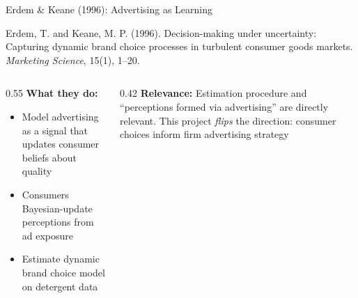 \documentclass[aspectratio=169,professionalfonts]{beamer}
\newcommand{\hl}[1]{\textbf{\textcolor{UGARed}{#1}}}
\begin{document}
\begin{frame}{Erdem \& Keane (1996): Advertising as Learning}
  \begin{tcolorbox}[colback=red!5!white, colframe=UGARed, title=\textbf{Citation}]
    Erdem, T. and Keane, M. P. (1996). Decision-making under uncertainty: Capturing
    dynamic brand choice processes in turbulent consumer goods markets.
    \textit{Marketing Science}, 15(1), 1--20.
  \end{tcolorbox}
  \vspace{6pt}
  \begin{columns}[T]
    \begin{column}{0.55\textwidth}
      \hl{What they do:}
      \begin{itemize}
        \item Model advertising as a signal that updates consumer beliefs about quality
        \item Consumers Bayesian-update perceptions from ad exposure
        \item Estimate dynamic brand choice model on detergent data
      \end{itemize}
    \end{column}
    \begin{column}{0.42\textwidth}
      \hl{Relevance:} Estimation procedure and ``perceptions formed via advertising'' are
      directly relevant. This project \emph{flips} the direction: consumer choices inform
      firm advertising strategy
    \end{column}
  \end{columns}
\end{frame}
\end{document}
